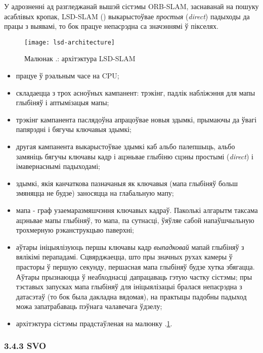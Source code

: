 У адрозненні ад разгледжанай вышэй сістэмы ORB-SLAM, заснаванай на пошуку
асаблівых кропак, LSD-SLAM (\cite{engel14eccv}) выкарыстоўвае \textit{простыя} (\textit{direct})
падыходы да працы з выявамі, то бок працуе непасрэдна са значэннямі ў пікселях.

\begin{figure}[H]
  \centering
  \texttt{[image: lsd-architecture]}
  \captionsetup{labelformat=empty}
  \caption{Малюнак \cursection.: архітэктура LSD-SLAM}
  \label{fig:lsd-architecture}
\end{figure}

\begin{itemize}
  \item працуе ў рэальным часе на CPU;
  \item складаецца з трох асноўных кампанент: трэкінг, падлік набліжэння для мапы
  глыбіняў і аптымізацыя мапы;
  \item трэкінг кампанента паслядоўна апрацоўвае новыя здымкі, прымаючы да ўвагі
  папярэдні і бягучы ключавыя здымкі;
  \item другая кампанента выкарыстоўвае здымкі каб альбо палепшыць, альбо замяніць
  бягучы ключавы кадр і ацэньвае глыбіню сцэны простымі (\textit{direct})
  і імавернаснымі падыходамі;
  \item здымкі, якія канчаткова пазначаныя як ключавыя (мапа глыбіняў больш
  змяняцца не будзе) заносяцца на глабальную мапу;
  \item мапа - граф узаемаразмяшчэння ключавых кадраў. Паколькі алгарытм таксама
  ацэньвае мапы глыбіняў, то мапа, па сутнасці, ўяўляе сабой напаўшчыльную
  трохмерную рэканструкцыю паверхні;
  \item аўтары ініцыялізуюць першы ключавы кадр \textit{выпадковай} мапай глыбіняў
  з вялікімі перападамі. Сцвярджаецца, што пры значных рухах камеры ў прасторы
  ў першую секунду, першасная мапа глыбіняў будзе хутка збягацца. Аўтары прызнаюцца
  ў неабходнасці дапрацаваць гэтую частку сістэмы; пры тэставых запусках мапа
  глыбіняў для ініцыялізацыі бралася непасрэдна з датасэтаў (то бок была дакладна
  вядомая), на практыцы падобны падыход можа запатрабаваць пэўнага чалавечага ўдзелу;
  \item архітэктура сістэмы прадстаўленая на малюнку \cursection.\ref{fig:lsd-architecture}.
\end{itemize}

\renewcommand{\nextTitle}{3.4.3 SVO}
\addcontentsline{toc}{subsubsection}{\nextTitle}
\subsubsection*{\nextTitle}

